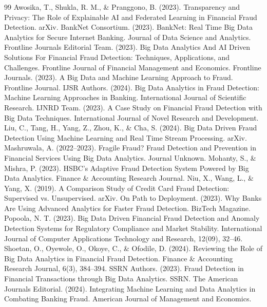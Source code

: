 \documentclass[11pt,a4paper]{article}
\begin{document}
\begin{thebibliography}{99}
 Awosika, T., Shukla, R. M., \& Pranggono, B. (2023). Transparency and Privacy: The Role of Explainable AI and Federated Learning in Financial Fraud Detection. arXiv.
 BankNet Consortium. (2023). BankNet: Real Time Big Data Analytics for Secure Internet Banking. Journal of Data Science and Analytics.
 Frontline Journals Editorial Team. (2023). Big Data Analytics And AI Driven Solutions For Financial Fraud Detection: Techniques, Applications, and Challenges. Frontline Journal of Financial Management and Economics.
 Frontline Journals. (2023). A Big Data and Machine Learning Approach to Fraud. Frontline Journal.
 IJSR Authors. (2024). Big Data Analytics in Fraud Detection: Machine Learning Approaches in Banking. International Journal of Scientific Research.
 IJNRD Team. (2023). A Case Study on Financial Fraud Detection with Big Data Techniques. International Journal of Novel Research and Development.
 Liu, C., Tang, H., Yang, Z., Zhou, K., \& Cha, S. (2024). Big Data Driven Fraud Detection Using Machine Learning and Real Time Stream Processing. arXiv.
 Mashruwala, A. (2022--2023). Fragile Fraud? Fraud Detection and Prevention in Financial Services Using Big Data Analytics. Journal Unknown.
 Mohanty, S., \& Mishra, P. (2023). HSBC's Adaptive Fraud Detection System Powered by Big Data Analytics. Finance \& Accounting Research Journal.
 Niu, X., Wang, L., \& Yang, X. (2019). A Comparison Study of Credit Card Fraud Detection: Supervised vs. Unsupervised. arXiv.
 On Path to Deployment. (2023). Why Banks Are Using Advanced Analytics for Faster Fraud Detection. BizTech Magazine.
 Popoola, N. T. (2023). Big Data Driven Financial Fraud Detection and Anomaly Detection Systems for Regulatory Compliance and Market Stability. International Journal of Computer Applications Technology and Research, 12(09), 32--46.
 Shoetan, O., Oyewole, O., Okoye, C., \& Ofodile, D. (2024). Reviewing the Role of Big Data Analytics in Financial Fraud Detection. Finance \& Accounting Research Journal, 6(3), 384--394.
 SSRN Authors. (2023). Fraud Detection in Financial Transactions through Big Data Analytics. SSRN.
 The American Journals Editorial. (2024). Integrating Machine Learning and Data Analytics in Combating Banking Fraud. American Journal of Management and Economics.

\end{thebibliography}
\end{document}
